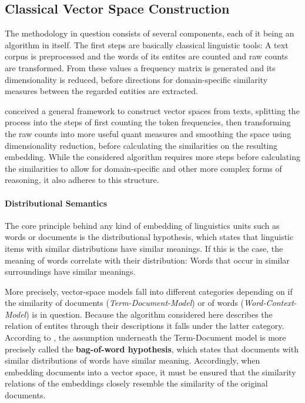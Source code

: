 \subsection{Classical Vector Space Construction}
\label{sec:vsm_construction}

The methodology in question consists of several components, each of it being an algorithm in itself. The first steps are basically classical linguistic tools: A text corpus is preprocessed and the words of its entites are counted and raw counts are transformed. From these values a frequency matrix is generated and its dimensionality is reduced, before directions for domain-specific similarity measures between the regarded entities are extracted.

\textcite{Lowe} conceived a general framework to construct vector spaces from texts, splitting the process into the steps of first counting the token frequencies, then transforming the raw counts into more useful \gls{quant} measures %
and smoothing the space using dimensionality reduction, before calculating the similarities on the resulting embedding. While the considered algorithm requires more steps before calculating the similarities to allow for domain-specific and other more complex forms of reasoning, it also adheres to this structure.%

\paragraph{Distributional Semantics}
\label{sec:bow_hypothesis}

\begin{quote}
    \textit{} \textcite{firth57synopsis}
\end{quote}

The core principle behind any kind of embedding of linguistics units such as words or documents is the distributional hypothesis, which states that linguistic items with similar distributions have similar meanings. If this is the case, the meaning of words correlate with their distribution: Words that occur in similar surroundings have similar meanings.

More precisely, vector-space models fall into different categories depending on if the similarity of documents (\textit{Term-Document-Model}) or of words (\textit{Word-Context-Model}) is in question. Because the algorithm considered here describes the relation of entites through their descriptions it falls under the latter category. According to \textcite{Turney2010}, the assumption underneath the Term-Document model is more precisely called the \textbf{bag-of-word hypothesis}, which states that documents with similar distributions of words have similar meaning. Accordingly, when embedding documents into a vector space, it must be ensured that the similarity relations of the embeddings closely resemble the similarity of the original documents.

